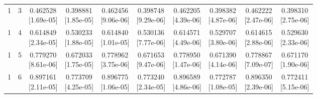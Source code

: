 \documentclass[12pt,letterpaper]{article}
\theoremstyle{plain}
\theoremstyle{definition}
\begin{document}
\begin{table}[p]
\begin{adjustbox}{max width=\linewidth}
\begin{tabular}{@{}rr*{8}{c}@{}}
1 & 3 & \shortstack{0.462528\\[-1pt]{\scriptsize[1.69e-05]}} & \shortstack{0.398881\\[-1pt]{\scriptsize[1.85e-05]}} & \shortstack{0.462456\\[-1pt]{\scriptsize[9.06e-06]}} & \shortstack{0.398748\\[-1pt]{\scriptsize[9.29e-06]}} & \shortstack{0.462205\\[-1pt]{\scriptsize[4.39e-06]}} & \shortstack{0.398382\\[-1pt]{\scriptsize[4.87e-06]}} & \shortstack{0.462222\\[-1pt]{\scriptsize[2.47e-06]}} & \shortstack{0.398310\\[-1pt]{\scriptsize[2.75e-06]}}\\
1 & 4 & \shortstack{0.614849\\[-1pt]{\scriptsize[2.34e-05]}} & \shortstack{0.530233\\[-1pt]{\scriptsize[1.88e-05]}} & \shortstack{0.614840\\[-1pt]{\scriptsize[1.01e-05]}} & \shortstack{0.530136\\[-1pt]{\scriptsize[7.77e-06]}} & \shortstack{0.614571\\[-1pt]{\scriptsize[4.49e-06]}} & \shortstack{0.529707\\[-1pt]{\scriptsize[3.80e-06]}} & \shortstack{0.614615\\[-1pt]{\scriptsize[2.88e-06]}} & \shortstack{0.529630\\[-1pt]{\scriptsize[2.33e-06]}}\\
1 & 5 & \shortstack{0.779270\\[-1pt]{\scriptsize[8.61e-06]}} & \shortstack{0.672033\\[-1pt]{\scriptsize[1.75e-05]}} & \shortstack{0.778962\\[-1pt]{\scriptsize[3.75e-06]}} & \shortstack{0.671653\\[-1pt]{\scriptsize[9.47e-06]}} & \shortstack{0.778950\\[-1pt]{\scriptsize[1.47e-06]}} & \shortstack{0.671390\\[-1pt]{\scriptsize[4.14e-06]}} & \shortstack{0.778867\\[-1pt]{\scriptsize[7.09e-07]}} & \shortstack{0.671170\\[-1pt]{\scriptsize[1.90e-06]}}\\
1 & 6 & \shortstack{0.897161\\[-1pt]{\scriptsize[2.11e-05]}} & \shortstack{0.773709\\[-1pt]{\scriptsize[4.25e-05]}} & \shortstack{0.896775\\[-1pt]{\scriptsize[1.06e-05]}} & \shortstack{0.773240\\[-1pt]{\scriptsize[2.34e-05]}} & \shortstack{0.896589\\[-1pt]{\scriptsize[4.86e-06]}} & \shortstack{0.772787\\[-1pt]{\scriptsize[1.08e-05]}} & \shortstack{0.896350\\[-1pt]{\scriptsize[2.39e-06]}} & \shortstack{0.772411\\[-1pt]{\scriptsize[5.15e-06]}}\\

\end{tabular}
\end{adjustbox}
\end{table}
\end{document}
